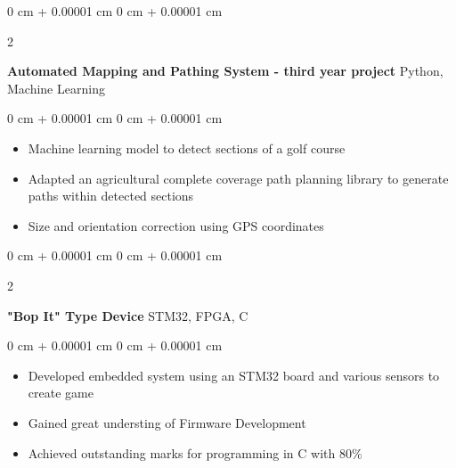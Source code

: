\documentclass[10pt, letterpaper]{article}
\newenvironment{highlights}{
    \begin{itemize}[
        topsep=0.10 cm,
        parsep=0.10 cm,
        partopsep=0pt,
        itemsep=0pt,
        leftmargin=0 cm + 10pt
    ]
}{
    \end{itemize}
} %
\newenvironment{onecolentry}{
    \begin{adjustwidth}{
        0 cm + 0.00001 cm
    }{
        0 cm + 0.00001 cm
    }
}{
    \end{adjustwidth}
} %
\newenvironment{twocolentry}[2][]{
    \onecolentry
    \def\secondColumn{#2}
    \setcolumnwidth{\fill, 4.5 cm}
    \begin{paracol}{2}
}{
    \switchcolumn \raggedleft \secondColumn
    \end{paracol}
    \endonecolentry
} %
\begin{document}
    \vspace{0.2 cm}

    \begin{twocolentry}{
        Python, Machine Learning
    }

    \textbf{Automated Mapping and Pathing System - third year project}\end{twocolentry}
    \vspace{0.10 cm}
    \begin{onecolentry}
        \begin{highlights}
            \item Machine learning model to detect sections of a golf course
            \item Adapted an agricultural complete coverage path planning library to generate paths within detected sections
            \item Size and orientation correction using GPS coordinates
        \end{highlights}
    \end{onecolentry}

    \vspace{0.2 cm}

    \begin{twocolentry}{
        STM32, FPGA, C
    }
        \textbf{"Bop It" Type Device}\end{twocolentry}

    \vspace{0.10 cm}
    \begin{onecolentry}
        \begin{highlights}
            \item Developed embedded system using an STM32 board and various sensors to create game 
            \item Gained great understing of Firmware Development
            \item Achieved outstanding marks for programming in C with 80\%
        \end{highlights}
    \end{onecolentry}
\end{document}
